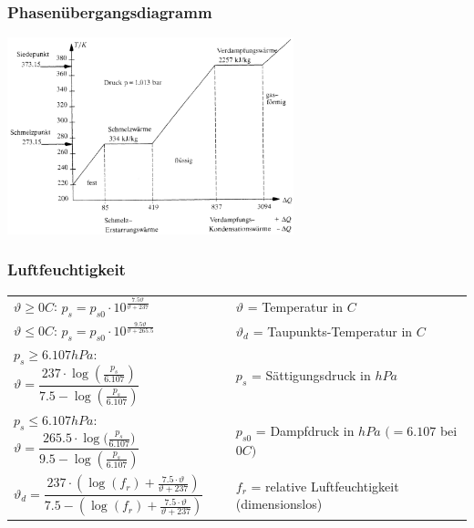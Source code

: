 		\begin{minipage}[t]{10cm}
			\subsubsection{Phasenübergangsdiagramm}
			\vspace{0.5cm}
			\vspace{-\ht\strutbox}\includegraphics[width=8.3cm]{./bilder/Phasenuebergangsdiagramm.png}
		\end{minipage}
		\vspace{1cm}
		\subsubsection{Luftfeuchtigkeit}
			\begin{minipage}[t]{13cm}
					\renewcommand{\arraystretch}{3}
					\begin{tabular}{ p{7cm} | p{9cm}}
						$\vartheta \geq 0 $\textdegree$ C$: \quad $p_s = p_{s0} \cdot 10^{\frac{7.5 \vartheta}{\vartheta +237}}$	&	$\vartheta$ = Temperatur in \textdegree $C$\\
						$\vartheta \leq 0 $\textdegree$ C$: \quad $p_s = p_{s0} \cdot 10^{\frac{9.5 \vartheta}{\vartheta +265.5}}$	&	$\vartheta_d$ = Taupunkts-Temperatur in \textdegree $C$\\
						$p_s \geq 6.107hPa$: \quad $\vartheta = \dfrac{237 \cdot \log{(\frac{p_s}{6.107})}}{7.5 - \log{(\frac{p_s}{6.107})}}$	&	$p_s$ = Sättigungsdruck in $hPa$\\
						$p_s \leq 6.107hPa$: \quad $\vartheta = \dfrac{265.5 \cdot \log{(\frac{p_s}{6.107}})}{9.5 - \log{(\frac{p_s}{6.107})}}$	&	$p_{s0}$ = Dampfdruck in $hPa$ $(= 6.107$ bei $0 $\textdegree$ C)$\\
						$\vartheta_d = \dfrac{237 \cdot (\log{(f_r)} + \frac{7.5 \cdot \vartheta}{\vartheta +237})}{7.5 - (\log{(f_r)} + \frac{7.5 \cdot \vartheta}{\vartheta +237})}$	& $f_r$ = relative Luftfeuchtigkeit (dimensionslos)\\
					\end{tabular}
					\renewcommand{\arraystretch}{1}
			\end{minipage}

